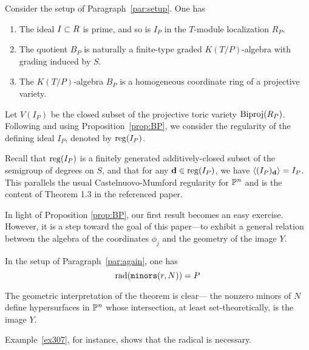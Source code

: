 \documentclass[fleqn,reqno]{amsart}
\begin{document}
\begin{proposition}
\label{prop:BP} Consider the setup of Paragraph~\ref{par:setup}. One has
\begin{enumerate}
\item
The ideal $I\subset R$ is prime, and so is $I_P$ in the $T$-module localization $R_P$.

\item
The quotient $B_P$ is naturally a finite-type graded $K(T/P)$-algebra with grading induced by $S$.

\item\label{itm:BPKTP-alg}
The $K(T/P)$-algebra $B_P$ is a homogeneous coordinate ring of a projective variety.
\end{enumerate}
\end{proposition}

\begin{paragraf}
\label{par:reg-IP}
Let $V(I_P)$ be the closed subset of the projective toric variety $\operatorname{Biproj}(R_P)$.
Following \citet{MS-04} and using Proposition~\ref{prop:BP},
we consider the regularity of the defining ideal $I_P$,
denoted by $\operatorname{reg}(I_P)$.

Recall that $\operatorname{reg}(I_P)$ is a finitely generated additively-closed subset
of the semigroup of degrees on $S$, and that
for any $\mathbf d\in\operatorname{reg}(I_P)$, we have $\langle(I_P)_\mathbf d\rangle=I_P$.
This parallels the usual Castelnuovo-Mumford regularity for $\mathbb{P}^n$
and is the content of Theorem 1.3 in the referenced paper.
\end{paragraf}

\begin{paragraf*}
In light of Proposition \ref{prop:BP}, our first result becomes an easy exercise.
However, it is a step toward the goal of this paper---to exhibit a general relation between
the algebra of the coordinates $\phi_j$ and the geometry of the image $Y$.
\end{paragraf*}

\begin{theorem}
\label{thm:rad-minors}
In the setup of Paragraph~\ref{par:again}, one has
\[
	\operatorname{rad}(\mathop{\tt minors}(r,N))=P
\]
\end{theorem}

\begin{paragraf*}
The geometric interpretation of the theorem is clear---%
the nonzero minors of $N$ define hypersurfaces in $\mathbb{P}^n$ whose intersection,
at least set-theoretically, is the image $Y$.

Example~\ref{ex307}, for instance, shows that the radical is necessary.
\end{paragraf*}
\end{document}
